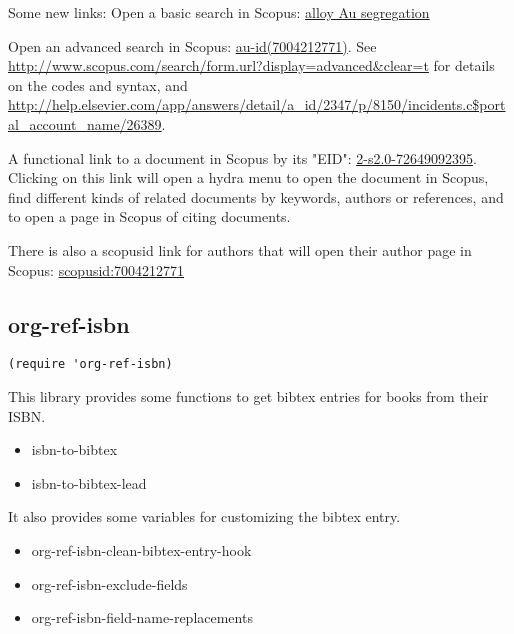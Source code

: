 \documentclass[11pt]{article}
\begin{document}
Some new links:
Open a basic search in Scopus: \href{http://www.scopus.com/results/results.url?sort=plf-f&src=s&sot=b&sdt=b&sl=35&s=TITLE-ABS-KEY%28alloy%20Au%20segregation%29&origin=searchbasic}{alloy Au segregation}

Open an advanced search in Scopus: \href{http://www.scopus.com/results/results.url?sort=plf-f&src=s&sot=a&sdt=a&sl=21&s=au-id%287004212771%29&origin=searchadvanced}{au-id(7004212771)}. See \url{http://www.scopus.com/search/form.url?display=advanced\&clear=t} for details on the codes and syntax, and \url{http://help.elsevier.com/app/answers/detail/a\_id/2347/p/8150/incidents.c\$portal\_account\_name/26389}.

A functional link to a document in Scopus by its "EID": \href{http://www.scopus.com/record/display.url?eid=2-s2.0-72649092395&origin=resultslist}{2-s2.0-72649092395}. Clicking on this link will open a hydra menu to open the document in Scopus, find different kinds of related documents by keywords, authors or references, and to open a page in Scopus of citing documents.

There is also a scopusid link for authors that will open their author page in Scopus: \href{http://www.scopus.com/authid/detail.url?origin=AuthorProfile&authorId=7004212771}{scopusid:7004212771}

\subsection{org-ref-isbn}
\label{sec:orga6bcc1d}

\begin{verbatim}
(require 'org-ref-isbn)
\end{verbatim}

This library provides some functions to get bibtex entries for books from their ISBN.

\begin{itemize}
\item isbn-to-bibtex
\item isbn-to-bibtex-lead
\end{itemize}

It also provides some variables for customizing the bibtex entry.

\begin{itemize}
\item org-ref-isbn-clean-bibtex-entry-hook
\item org-ref-isbn-exclude-fields
\item org-ref-isbn-field-name-replacements
\end{itemize}
\end{document}
